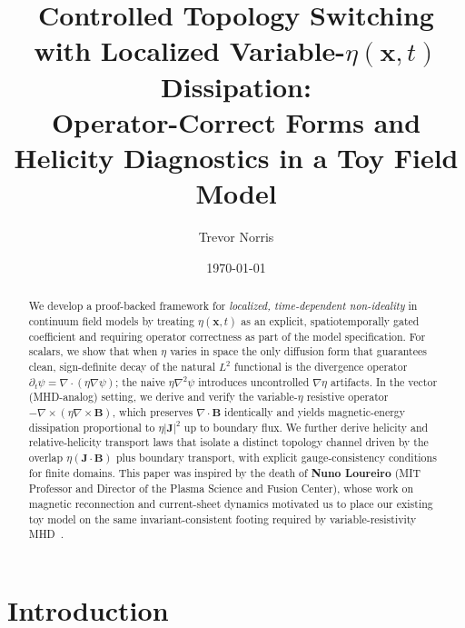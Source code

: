 \documentclass[11pt]{article}
\title{Controlled Topology Switching with Localized Variable-$\eta(\mathbf{x},t)$ Dissipation:\\
Operator-Correct Forms and Helicity Diagnostics in a Toy Field Model}
\author{Trevor Norris}
\date{\today}
\theoremstyle{plain}
\theoremstyle{definition}
\theoremstyle{remark}
\begin{document}
\maketitle

\begin{abstract}
We develop a proof-backed framework for \emph{localized, time-dependent non-ideality} in continuum field models by treating $\eta(\mathbf{x},t)$ as an explicit, spatiotemporally gated coefficient and requiring operator correctness as part of the model specification. For scalars, we show that when $\eta$ varies in space the only diffusion form that guarantees clean, sign-definite decay of the natural $L^2$ functional is the divergence operator $\partial_t\psi=\nabla\cdot(\eta\nabla\psi)$; the naive $\eta\nabla^2\psi$ introduces uncontrolled $\nabla\eta$ artifacts. In the vector (MHD-analog) setting, we derive and verify the variable-$\eta$ resistive operator $-\nabla\times(\eta\nabla\times\mathbf{B})$, which preserves $\nabla\cdot\mathbf{B}$ identically and yields magnetic-energy dissipation proportional to $\eta|\mathbf{J}|^2$ up to boundary flux. We further derive helicity and relative-helicity transport laws that isolate a distinct topology channel driven by the overlap $\eta(\mathbf{J}\cdot\mathbf{B})$ plus boundary transport, with explicit gauge-consistency conditions for finite domains. This paper was inspired by the death of \textbf{Nuno Loureiro} (MIT Professor and Director of the Plasma Science and Fusion Center), whose work on magnetic reconnection and current-sheet dynamics motivated us to place our existing toy model on the same invariant-consistent footing required by variable-resistivity MHD~\cite{Norris:Paper4,Norris:Paper6}.
\end{abstract}

\section{Introduction}\label{sec:intro}
\end{document}
